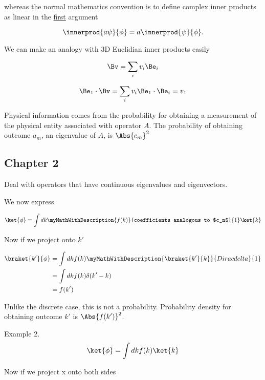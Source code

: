 whereas the normal mathematics convention is to define complex inner products as linear in the \underline{first} argument

\begin{equation}\label{eqn:PHY356FLecture10:51f}
\innerprod{a \psi}{\phi} = a \innerprod{\psi}{\phi}.
\end{equation}

We can make an analogy with 3D Euclidian inner products easily

\begin{align*}
\Bv = \sum_i v_i \Be_i
\end{align*}

\begin{align*}
\Be_1 \cdot \Bv = \sum_i v_i \Be_1 \cdot \Be_i = v_1
\end{align*}

Physical information comes from the probability for obtaining a measurement of the physical entity associated with operator $A$.  The probability of obtaining outcome $a_m$, an eigenvalue of $A$, is $\Abs{c_m}^2$

\subsection{Chapter 2}

Deal with operators that have continuous eigenvalues and eigenvectors.

We now express

\begin{align*}
\ket{\phi} = \int dk \myMathWithDescription{f(k)}{coefficients analogous to $c_n$}{1} \ket{k}
\end{align*}

Now if we project onto $k'$

\begin{align*}
\braket{k'}{\phi}
&= \int dk f(k) \myMathWithDescription{\braket{k'}{k}}{Dirac delta}{1} \\
&= \int dk f(k) \delta(k' -k) \\
&= f(k')
\end{align*}

Unlike the discrete case, this is not a probability.  Probability density for obtaining outcome $k'$ is $\Abs{f(k')}^2$.

Example 2.
\begin{align*}
\ket{\phi} = \int dk f(k) \ket{k}
\end{align*}

Now if we project x onto both sides

